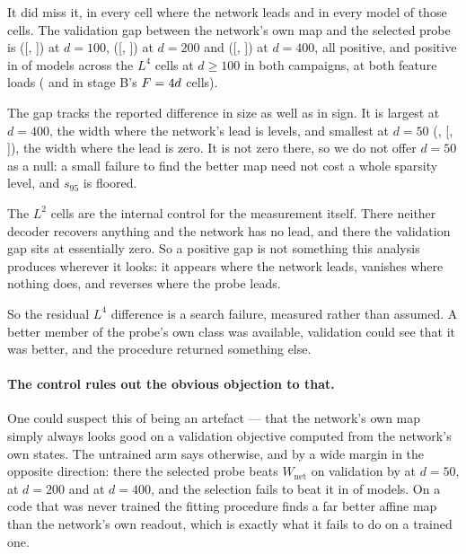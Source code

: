 It did miss it, in every cell where the network leads and in every model of those cells. The
validation gap between the network's own map and the selected probe is
\CeilLfourHundredValGap{} ([\CeilLfourHundredValCiLow, \CeilLfourHundredValCiHigh]) at $d=100$,
\CeilLfourTwoHundredValGap{} ([\CeilLfourTwoHundredValCiLow, \CeilLfourTwoHundredValCiHigh]) at
$d=200$ and \CeilLfourFourHundredValGap{}
([\CeilLfourFourHundredValCiLow, \CeilLfourFourHundredValCiHigh]) at $d=400$, all positive, and
positive in \CeilLfourMissed{} of \CeilLfourModels{} models across the \CeilLfourCells{} $L^4$ cells
at $d\ge100$ in both campaigns, at both feature loads
(\CeilSbLfourHundredValGap{} and \CeilSbLfourTwoHundredValGap{} in stage B's $F=4 d$ cells).

The gap tracks the reported difference in size as well as in sign. It is largest at $d=400$, the
width where the network's lead is \ScPrimDiff{} levels, and smallest at $d=50$
(\CeilLfourFiftyValGap, [\CeilLfourFiftyValCiLow, \CeilLfourFiftyValCiHigh]), the width where the
lead is zero. It is not zero there, so we do not offer $d=50$ as a null: a small failure to find the
better map need not cost a whole sparsity level, and $s_{95}$ is floored.

The $L^2$ cells are the internal control for the measurement itself. There neither decoder recovers
anything and the network has no lead, and there the validation gap sits at essentially zero. So a
positive gap is not something this analysis produces wherever it looks: it appears where the network
leads, vanishes where nothing does, and reverses where the probe leads.

So the residual $L^4$ difference is a search failure, measured rather than assumed. A better member
of the probe's own class was available, validation could see that it was better, and the procedure
returned something else.

\paragraph{The control rules out the obvious objection to that.} One could suspect this of being an
artefact --- that the network's own map simply always looks good on a validation objective computed
from the network's own states. The untrained arm says otherwise, and by a wide margin in the
opposite direction: there the selected probe beats $W_{\mathrm{net}}$ on validation by
\CeilRandFiftyValGap{} at $d=50$, \CeilRandTwoHundredValGap{} at $d=200$ and
\CeilRandFourHundredValGap{} at $d=400$, and the selection fails to beat it in
\CeilRandMissed{} of \CeilRandModels{} models. On a code that was never trained the fitting procedure
finds a far better affine map than the network's own readout, which is exactly what it fails to do on
a trained one.

